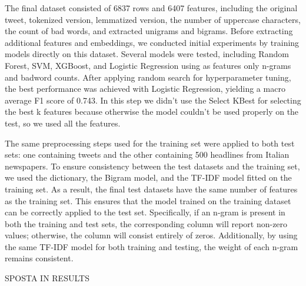 The final dataset consisted of 6837 rows and 6407 features, including the original tweet, tokenized version, lemmatized version, the number of uppercase characters, the count of bad words, and extracted unigrams and bigrams. Before extracting additional features and embeddings, we conducted initial experiments by training models directly on this dataset.
Several models were tested, including Random Forest, SVM, XGBoost, and Logistic Regression using as features only n-grams and badword counts. After applying random search for hyperparameter tuning, the best performance was achieved with Logistic Regression, yielding a macro average F1 score of 0.743.
In this step we didn’t use the Select KBest for selecting the best k features because otherwise the model couldn’t be used properly on the test, so we used all the features.

The same preprocessing steps used for the training set were applied to both test sets: one containing tweets and the other containing 500 headlines from Italian newspapers. To ensure consistency between the test datasets and the training set, we used the dictionary, the Bigram model, and the TF-IDF model fitted on the training set.
As a result, the final test datasets have the same number of features as the training set. This ensures that the model trained on the training dataset can be correctly applied to the test set. Specifically, if an n-gram is present in both the training and test sets, the corresponding column will report non-zero values; otherwise, the column will consist entirely of zeros. Additionally, by using the same TF-IDF model for both training and testing, the weight of each n-gram remains consistent.

SPOSTA IN RESULTS
